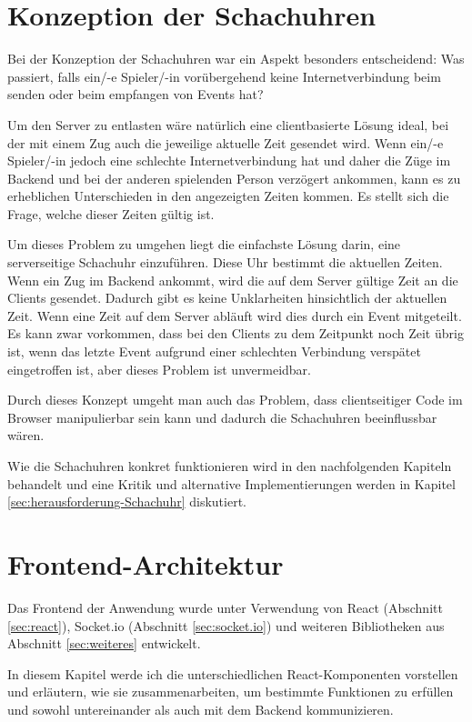 \section{Konzeption der Schachuhren}
\label{sec:Konzept-Schachuhr}
Bei der Konzeption der Schachuhren war ein Aspekt besonders entscheidend: Was passiert, falls ein/-e Spieler/-in vorübergehend keine Internetverbindung beim senden oder beim empfangen von Events hat?

Um den Server zu entlasten wäre natürlich eine clientbasierte Lösung ideal, bei der mit einem Zug auch die jeweilige aktuelle Zeit gesendet wird. Wenn ein/-e Spieler/-in jedoch eine schlechte Internetverbindung hat und daher die Züge im Backend und bei der anderen spielenden Person verzögert ankommen, kann es zu erheblichen Unterschieden in den angezeigten Zeiten kommen. Es stellt sich die Frage, welche dieser Zeiten gültig ist.

Um dieses Problem zu umgehen liegt die einfachste Lösung darin, eine serverseitige Schachuhr einzuführen. Diese Uhr bestimmt die aktuellen Zeiten. Wenn ein Zug im Backend ankommt, wird die auf dem Server gültige Zeit an die Clients gesendet. Dadurch gibt es keine Unklarheiten hinsichtlich der aktuellen Zeit. Wenn eine Zeit auf dem Server abläuft wird dies durch ein Event mitgeteilt. Es kann zwar vorkommen, dass bei den Clients zu dem Zeitpunkt noch Zeit übrig ist, wenn das letzte Event aufgrund einer schlechten Verbindung verspätet eingetroffen ist, aber dieses Problem ist unvermeidbar.

Durch dieses Konzept umgeht man auch das Problem, dass clientseitiger Code im Browser manipulierbar sein kann und dadurch die Schachuhren beeinflussbar wären.

Wie die Schachuhren konkret funktionieren wird in den nachfolgenden Kapiteln behandelt und eine Kritik und alternative Implementierungen werden in Kapitel \ref{sec:herausforderung-Schachuhr} diskutiert.

    \section{Frontend-Architektur}
Das Frontend der Anwendung wurde unter Verwendung von React (Abschnitt \ref{sec:react}), Socket.io (Abschnitt \ref{sec:socket.io}) und weiteren Bibliotheken aus Abschnitt \ref{sec:weiteres} entwickelt.

In diesem Kapitel werde ich die unterschiedlichen React-Komponenten vorstellen und erläutern, wie sie zusammenarbeiten, um bestimmte Funktionen zu erfüllen und sowohl untereinander als auch mit dem Backend kommunizieren.

